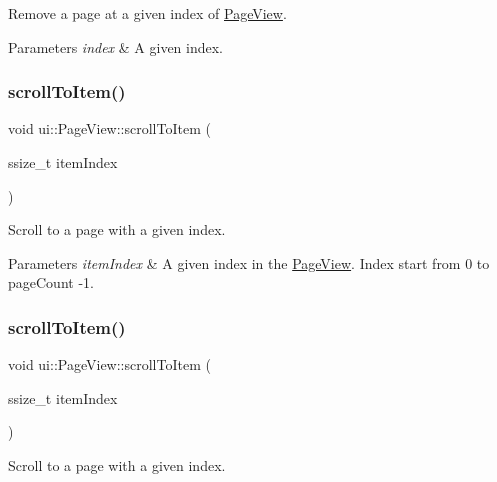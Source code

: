 Remove a page at a given index of \hyperlink{classui_1_1PageView}{Page\+View}.


\begin{DoxyParams}{Parameters}
{\em index} & A given index. \\
\hline
\end{DoxyParams}
\mbox{\label{classui_1_1PageView_ad0c9adc302818366c639e6425f4da898}} 
\subsubsection{\texorpdfstring{scroll\+To\+Item()}{scrollToItem()}\hspace{0.1cm}{\footnotesize\ttfamily [1/3]}}
{\footnotesize\ttfamily void ui\+::\+Page\+View\+::scroll\+To\+Item (\begin{DoxyParamCaption}\item[{ssize\+\_\+t}]{item\+Index }\end{DoxyParamCaption})}

Scroll to a page with a given index.


\begin{DoxyParams}{Parameters}
{\em item\+Index} & A given index in the \hyperlink{classui_1_1PageView}{Page\+View}. Index start from 0 to page\+Count -\/1. \\
\hline
\end{DoxyParams}
\mbox{\label{classui_1_1PageView_ad0c9adc302818366c639e6425f4da898}} 
\subsubsection{\texorpdfstring{scroll\+To\+Item()}{scrollToItem()}\hspace{0.1cm}{\footnotesize\ttfamily [2/3]}}
{\footnotesize\ttfamily void ui\+::\+Page\+View\+::scroll\+To\+Item (\begin{DoxyParamCaption}\item[{ssize\+\_\+t}]{item\+Index }\end{DoxyParamCaption})}

Scroll to a page with a given index.


